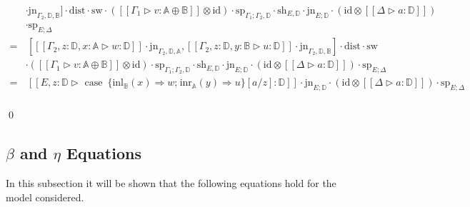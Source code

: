 \begin{equation*}
\begin{split}
      & \cdot\text{jn}_{\Gamma_2, \mathbb{D}, \mathbb{B}}]\cdot \text{dist} \cdot \text{sw} \cdot ([\![\Gamma_1 \triangleright v  : \mathbb{A} \oplus \mathbb{B}  ]\!] \otimes \text{id}) \cdot \text{sp}_{\Gamma_1;\Gamma_2, \mathbb{D}}  \cdot \text{sh}_{E,\mathbb{D}} \cdot \text{jn}_{E; \mathbb{D}} \cdot (\text{id} \otimes [\![ \Delta \triangleright a:\mathbb{D}  ]\!] ) \\
      &\cdot \text{sp}_{E;\Delta}  \\
      = &  \hspace{2pt} \left[[\![ \Gamma_2, z:\mathbb{D}, x:\mathbb{A} \triangleright w: \mathbb{D}  ]\!] \cdot  \text{jn}_{\Gamma_2, \mathbb{D}, \mathbb{A}} ,   [\![ \Gamma_2, z:\mathbb{D} , y:\mathbb{B} \triangleright u : \mathbb{D}  ]\!] \cdot \text{jn}_{\Gamma_2, \mathbb{D}, \mathbb{B}}\right] \cdot \text{dist} \cdot \text{sw}  \\
      & \cdot ([\![\Gamma_1 \triangleright v  : \mathbb{A} \oplus \mathbb{B}  ]\!] \otimes \text{id}) \cdot \text{sp}_{\Gamma_1; \Gamma_2, \mathbb{D}} \cdot \text{sh}_{E,\mathbb{D}} \cdot \text{jn}_{E; \mathbb{D}} \cdot (\text{id} \otimes [\![ \Delta \triangleright a:\mathbb{D}  ]\!] ) \cdot \text{sp}_{E;\Delta} \\
      = & \hspace{2pt}[\![E, z:\mathbb{D} \triangleright \text{ case }  \hspace{2pt}  \{\text{inl}_{\mathbb{B}} (x) \Rightarrow w ; \hspace{1pt} \text{inr}_{\mathbb{A}} (y) \Rightarrow u\} [a/z]: \mathbb{D}]\!] \cdot \text{jn}_{E; \mathbb{D}} \cdot (\text{id} \otimes [\![ \Delta \triangleright a:\mathbb{D}  ]\!] ) \cdot \text{sp}_{E;\Delta} \\
    \end{split}
      \end{equation*}

      \qed

\subsection{ \boldmath $\beta$ and $\eta$ Equations}


In this subsection it will be shown that the following equations hold for the model considered.

